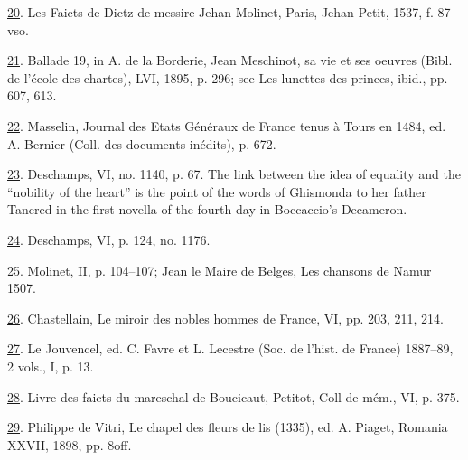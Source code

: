 \protect\hypertarget{23_NOTES.xhtmlux5cux23id_1893}{\protect\hyperlink{10_Chapter_Three__THE_HEROIC_DREAM.xhtmlux5cux23id_1892}{20}}.
Les Faicts de Dictz de messire Jehan Molinet, Paris, Jehan Petit, 1537,
f. 87 vso.

\protect\hypertarget{23_NOTES.xhtmlux5cux23id_1891}{\protect\hyperlink{10_Chapter_Three__THE_HEROIC_DREAM.xhtmlux5cux23id_1890}{21}}.
Ballade 19, in A. de la Borderie, Jean Meschinot, sa vie et ses oeuvres
(Bibl. de l'école des chartes), LVI, 1895, p. 296; see Les lunettes des
princes, ibid., pp. 607, 613.

\protect\hypertarget{23_NOTES.xhtmlux5cux23id_1889}{\protect\hyperlink{10_Chapter_Three__THE_HEROIC_DREAM.xhtmlux5cux23id_1888}{22}}.
Masselin, Journal des Etats Généraux de France tenus à Tours en 1484,
ed. A. Bernier (Coll. des documents inédits), p. 672.

\protect\hypertarget{23_NOTES.xhtmlux5cux23id_1887}{\protect\hyperlink{10_Chapter_Three__THE_HEROIC_DREAM.xhtmlux5cux23id_1886}{23}}.
Deschamps, VI, no. 1140, p. 67. The link between the idea of equality
and the ``nobility of the heart'' is the point of the words of Ghismonda
to her father Tancred in the first novella of the fourth day in
Boccaccio's Decameron.

\protect\hypertarget{23_NOTES.xhtmlux5cux23id_1885}{\protect\hyperlink{10_Chapter_Three__THE_HEROIC_DREAM.xhtmlux5cux23id_1884}{24}}.
Deschamps, VI, p. 124, no. 1176.

\protect\hypertarget{23_NOTES.xhtmlux5cux23id_1883}{\protect\hyperlink{10_Chapter_Three__THE_HEROIC_DREAM.xhtmlux5cux23id_1882}{25}}.
Molinet, II, p. 104--107; Jean le Maire de Belges, Les chansons de Namur
1507.

\protect\hypertarget{23_NOTES.xhtmlux5cux23id_1881}{\protect\hyperlink{10_Chapter_Three__THE_HEROIC_DREAM.xhtmlux5cux23id_1880}{26}}.
Chastellain, Le miroir des nobles hommes de France, VI, pp. 203, 211,
214.

\protect\hypertarget{23_NOTES.xhtmlux5cux23id_1879}{\protect\hyperlink{10_Chapter_Three__THE_HEROIC_DREAM.xhtmlux5cux23id_1878}{27}}.
Le Jouvencel, ed. C. Favre et L. Lecestre (Soc. de l'hist. de France)
1887--89, 2 vols., I, p. 13.

\protect\hypertarget{23_NOTES.xhtmlux5cux23id_1877}{\protect\hyperlink{10_Chapter_Three__THE_HEROIC_DREAM.xhtmlux5cux23id_1876}{28}}.
Livre des faicts du mareschal de Boucicaut, Petitot, Coll de mém., VI,
p. 375.

\protect\hypertarget{23_NOTES.xhtmlux5cux23id_1875}{\protect\hyperlink{10_Chapter_Three__THE_HEROIC_DREAM.xhtmlux5cux23id_1874}{29}}.
Philippe de Vitri, Le chapel des fleurs de lis (1335), ed. A. Piaget,
Romania XXVII, 1898, pp. 8off.

